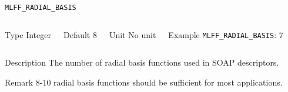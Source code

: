 \begin{frame}[allowframebreaks]{\texttt{{MLFF\_RADIAL\_BASIS}}} \label{MLFF_RADIAL_BASIS}
\vspace*{-12pt}
\begin{columns}
\begin{block}{Type}
Integer
\end{block}

\begin{block}{Default}
8
\end{block}

\begin{block}{Unit}
No unit
\end{block}

\begin{block}{Example}
\texttt{MLFF\_RADIAL\_BASIS}: 7
\end{block}
\end{columns}

\begin{block}{Description}
 The number of radial basis functions used in SOAP descriptors.
\end{block}

\begin{block}{Remark}
8-10 radial basis functions should be sufficient for most applications.
\end{block}
\end{frame}



